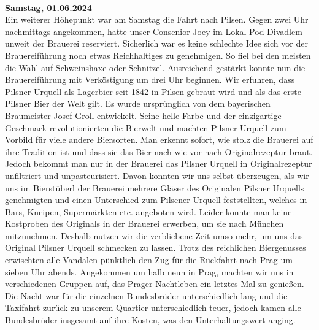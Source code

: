 \begin{multicols}{2}
\\
\textbf{Samstag, 01.06.2024}\\
Ein weiterer Höhepunkt war am Samstag die Fahrt nach Pilsen. Gegen zwei Uhr nachmittags angekommen, hatte unser Consenior Joey im Lokal Pod Divadlem unweit der Brauerei reserviert. Sicherlich war es keine schlechte Idee sich vor der Brauereiführung noch etwas Reichhaltiges zu genehmigen. So fiel bei den meisten die Wahl auf Schweinshaxe oder Schnitzel. Ausreichend gestärkt konnte nun die Brauereiführung mit Verköstigung um drei Uhr beginnen.
Wir erfuhren, dass Pilsner Urquell als Lagerbier seit 1842 in Pilsen gebraut wird und als das erste Pilsner Bier der Welt gilt. Es wurde ursprünglich von dem bayerischen Braumeister Josef Groll entwickelt. Seine helle Farbe und der einzigartige Geschmack revolutionierten die Bierwelt und machten Pilsner Urquell zum Vorbild für viele andere Biersorten. Man erkennt sofort, wie stolz die Brauerei auf ihre Tradition ist und dass sie das Bier nach wie vor nach Originalrezeptur braut. Jedoch bekommt man nur in der Brauerei das Pilsner Urquell in Originalrezeptur unfiltriert und unpasteurisiert. Davon konnten wir uns selbst überzeugen, als wir uns im Bierstüberl der Brauerei mehrere Gläser des Originalen Pilsner Urquells genehmigten und einen Unterschied zum Pilsener Urquell feststellten, welches in Bars, Kneipen, Supermärkten etc. angeboten wird. Leider konnte man keine Kostproben des Originals in der Brauerei erwerben, um sie nach München mitzunehmen. Deshalb nutzen wir die verbliebene Zeit umso mehr, um uns das Original Pilsner Urquell schmecken zu lassen.
Trotz des reichlichen Biergenusses erwischten alle Vandalen pünktlich den Zug für die Rückfahrt nach Prag um sieben Uhr abends. Angekommen um halb neun in Prag, machten wir uns in verschiedenen Gruppen auf, das Prager Nachtleben ein letztes Mal zu genießen. Die Nacht war für die einzelnen Bundesbrüder unterschiedlich lang und die Taxifahrt zurück zu unserem Quartier unterschiedlich teuer, jedoch kamen alle Bundesbrüder insgesamt auf ihre Kosten, was den Unterhaltungswert anging.\\


\end{multicols}
